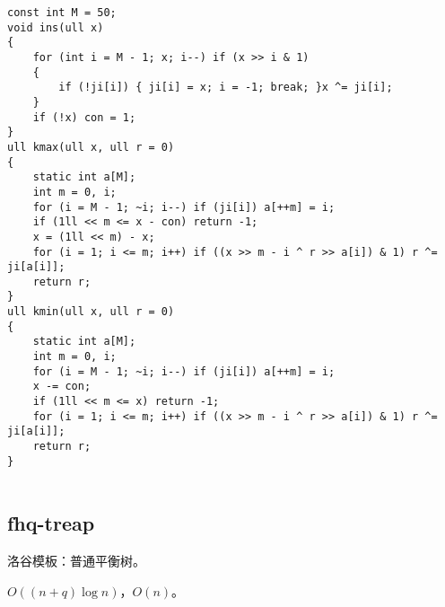 \documentclass[12pt]{ctexart}
\begin{document}
\begin{lstlisting}
const int M = 50;
void ins(ull x)
{
	for (int i = M - 1; x; i--) if (x >> i & 1)
	{
		if (!ji[i]) { ji[i] = x; i = -1; break; }x ^= ji[i];
	}
	if (!x) con = 1;
}
ull kmax(ull x, ull r = 0)
{
	static int a[M];
	int m = 0, i;
	for (i = M - 1; ~i; i--) if (ji[i]) a[++m] = i;
	if (1ll << m <= x - con) return -1;
	x = (1ll << m) - x;
	for (i = 1; i <= m; i++) if ((x >> m - i ^ r >> a[i]) & 1) r ^= ji[a[i]];
	return r;
}
ull kmin(ull x, ull r = 0)
{
	static int a[M];
	int m = 0, i;
	for (i = M - 1; ~i; i--) if (ji[i]) a[++m] = i;
	x -= con;
	if (1ll << m <= x) return -1;
	for (i = 1; i <= m; i++) if ((x >> m - i ^ r >> a[i]) & 1) r ^= ji[a[i]];
	return r;
}


\end{lstlisting}

\subsection{fhq-treap}

洛谷模板：普通平衡树。

$O((n+q)\log n)$，$O(n)$。
\end{document}
